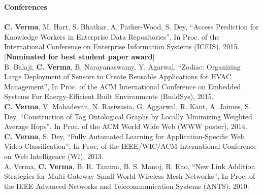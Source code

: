 \documentclass[12pt]{ucsddissertation}
\newcommand{\comment}[1]{}
\begin{document}
\begin{vita}
{\noindent\textbf{Conferences} \\ \\
\noindent \textbf{C. Verma}, M. Hart, S. Bhatkar, A. Parker-Wood, S. Dey, ``Access Prediction for Knowledge Workers in Enterprise Data Repositories'', In Proc. of the International Conference on Enterprise Information Systems (ICEIS), 2015. [\textbf{Nominated for best student paper award}] \\

\noindent B. Balaji, \textbf{C. Verma}, B. Narayanaswamy, Y. Agarwal, ``Zodiac: Organizing Large Deployment of Sensors to Create Reusable Applications for HVAC Management'', In Proc. of the ACM International Conference on Embedded Systems For Energy-Efficient Built Environments (BuildSys), 2015. \\

\noindent \textbf{C. Verma}, V. Mahadevan, N. Rasiwasia, G. Aggarwal, R. Kant, A. Jaimes, S. Dey, ``Construction of Tag Ontological Graphs by Locally Minimizing Weighted Average Hops'', In Proc. of the ACM World Wide Web (WWW poster), 2014. \\ 


\noindent \textbf{C. Verma}, S. Dey, ``Fully Automated Learning for Application-Specific Web Video Classification'', In Proc. of the IEEE/WIC/ACM International Conference on Web Intelligence (WI), 2013. \\ 

\noindent A. Verma, \textbf{C. Verma}, B. R. Tamma, B. S. Manoj, R. Rao, ``New Link Addition Strategies for Multi-Gateway Small World Wireless Mesh Networks'', In Proc. of the IEEE Advanced Networks and  Telecommunication Systems (ANTS), 2010. 

}

\comment{

\fieldsofstudy
\noindent Major Field: Engineering (Specialization or Focused Studies)
\vskip\baselineskip
Studies in Applied Mathematics\par
Professors Alpha Beta and Gamma Delta
\vskip\baselineskip
Studies in Mechanices\par
Professors Epsilon Zeta and Eta Theta
\vskip\baselineskip
Studies in Electromagnetism\par
Professors Iota Kappa and Lambda Mu

}
\end{vita}
\end{document}

